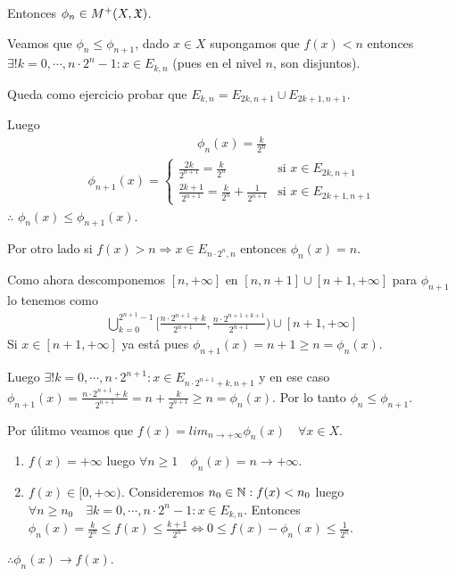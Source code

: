 Entonces $\phi_n \in M^+(X ,\mathfrak{X})$.

Veamos que $\phi_n \leq \phi_{n+1}$, dado $x \in X$ supongamos que $f(x) < n$ entonces $\exists! k = 0, \cdots, n \cdot 2^n - 1 : x \in E_{k, n}$ (pues en el nivel $n$, son disjuntos).

Queda como ejercicio probar que $E_{k, n} = E_{2k, n+1} \cup E_{2k+1, n+1}$.

Luego
\begin{align*}
    \phi_n(x) = \frac{k}{2^n}
\end{align*}
\begin{align*}\phi_{n+1}(x) = \begin{cases}
                        \frac{2k}{2^{n+1}} = \frac{k}{2^n}                       & \text{si } x \in E_{2k, n+1}   \\
                        \frac{2k+1}{2^{n+1}} = \frac{k}{2^n} + \frac{1}{2^{n+1}} & \text{si } x \in E_{2k+1, n+1}
                    \end{cases}
\end{align*} $\therefore$ $\phi_n(x) \leq \phi_{n+1}(x)$.

Por otro lado si $f(x) > n \Rightarrow x \in E_{n \cdot 2^n, n}$ entonces $\phi_n(x) = n$.

Como ahora descomponemos $[n, +\infty]$ en $[n, n+1] \cup [n+1, +\infty]$ para $\phi_{n+1}$ lo tenemos como \begin{align*}
    \bigcup_{k = 0}^{2^{n+1}-1} [ \frac{n \cdot 2^{n+1} + k}{2^{n+1}}, \frac{n \cdot 2^{n+1 + k+1}}{2^{n+1}} ) \cup [n+1, +\infty]
\end{align*}
Si $x \in [n+1, +\infty]$ ya está pues $\phi_{n+1}(x) = n+1 \geq n = \phi_n(x)$.

Luego $\exists ! k = 0, \cdots, n \cdot 2^{n+1} : x \in E_{n \cdot 2^{n+1}+k, n+1}$ y en ese caso
$\phi_{n+1}(x) = \frac{n \cdot 2^{n+1} + k}{2^{n+1}} = n + \frac{k}{2^{n+1}} \geq n = \phi_n(x)$.
Por lo tanto $\phi_n \leq \phi_{n+1}$.

Por úlitmo veamos que $f(x) = lim_{n \to +\infty} \phi_n(x) \quad \forall x \in X$.
\begin{enumerate}
    \item $f(x) = +\infty$ luego $\forall n \geq 1 \quad \phi_n(x) = n \to +\infty$.
    \item $f(x) \in [0, +\infty)$. Consideremos $n_0 \in \mathbb{N} : f(x) < n_0$ luego $\forall n \geq n_0 \quad \exists k = 0, \cdots, n \cdot 2^n - 1 : x \in E_{k, n}$.
          Entonces $\phi_n(x) = \frac{k}{2^n} \leq f(x) \leq \frac{k+1}{2^n} \iff 0 \leq f(x) - \phi_n(x) \leq \frac{1}{2^n}$.
\end{enumerate}
$\therefore \phi_n(x) \to f(x)$.

